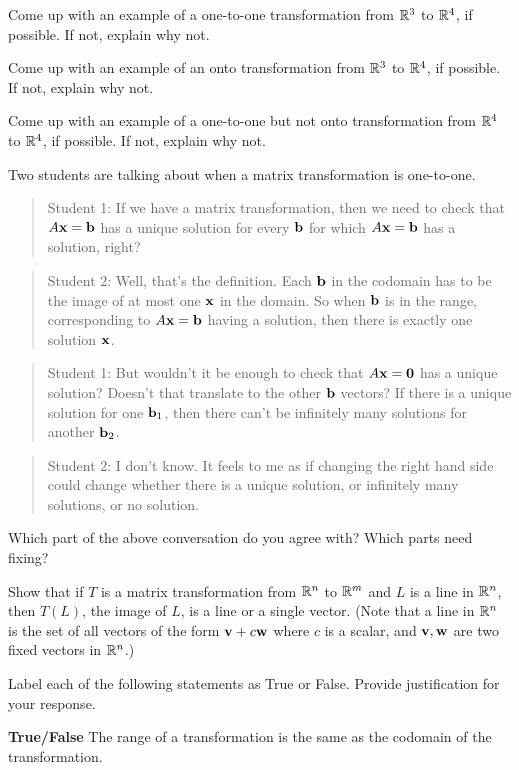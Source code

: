 \item Come up with an example of a one-to-one transformation from $\mathbb{R}^3$ to $\mathbb{R}^4$, if possible. If not, explain why not.

\item Come up with an example of an onto transformation from $\mathbb{R}^3$ to $\mathbb{R}^4$, if possible. If not, explain why not.

\item Come up with an example of a one-to-one but not onto transformation from $\mathbb{R}^4$ to $\mathbb{R}^4$, if possible. If not, explain why not.

\item Two students are talking about when a matrix transformation is one-to-one.
\begin{quote}
Student 1: If we have a matrix transformation, then we need to check that $A\mathbf{x}=\mathbf{b}$ has a unique solution for every $\mathbf{b}$ for which $A\mathbf{x}=\mathbf{b}$ has a solution, right?
\end{quote} 
\begin{quote}
Student 2: Well, that's the definition. Each $\mathbf{b}$ in the codomain has to be the image of at most one $\mathbf{x}$ in the domain. So when $\mathbf{b}$ is in the range, corresponding to $A\mathbf{x}=\mathbf{b}$ having a solution, then there is exactly one solution $\mathbf{x}$.
\end{quote} 
\begin{quote}
Student 1: But wouldn't it be enough to check that $A\mathbf{x}=\mathbf{0}$ has a unique solution? Doesn't that translate to the other $\mathbf{b}$ vectors? If there is a unique solution for one $\mathbf{b}_1$, then there can't be infinitely many solutions for another $\mathbf{b}_2$.
\end{quote} 
\begin{quote}
Student 2: I don't know. It feels to me as if changing the right hand side could change whether there is a unique solution, or infinitely many solutions, or no solution.
\end{quote}
Which part of the above conversation do you agree with? Which parts need fixing? 

\item Show that if $T$ is a matrix transformation from $\mathbb{R}^n$ to $\mathbb{R}^m$ and $L$ is a line in $\mathbb{R}^n$, then $T(L)$, the image of $L$, is a line or a single vector. (Note that a line in $\mathbb{R}^n$ is the set of all vectors of the form $\mathbf{v}+c\mathbf{w}$ where $c$ is a scalar, and $\mathbf{v}, \mathbf{w}$ are two fixed vectors in $\mathbb{R}^n$.) 

\item Label each of the following statements as True or False. Provide justification for your response.
\ba
\item \textbf{True/False} The range of a transformation is the same as the codomain of the transformation.

